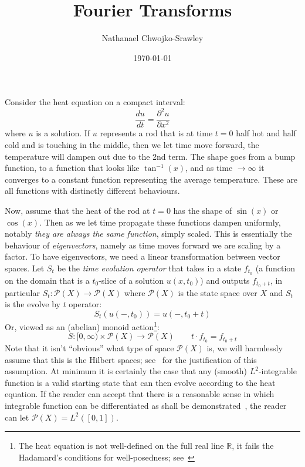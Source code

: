\documentclass{article}
\title{Fourier Transforms}
\author{Nathanael Chwojko-Srawley}
\date{\today}
\renewcommand{\maketitle}{
    \quad
    \vspace{1em}
  \begin{center}
      \LARGE\bfseries \thetitle \par
      \vspace{0.6em}
      \large
  \end{center}
    \vspace{1em}
}
\newcommand{\R}{{\mathbb{R}}}
\newcommand{\SP}{\mathscr{P}}
\begin{document}
\maketitle


Consider the heat equation on a compact interval:
\begin{equation}\label{eq:linHeatEq}
	\frac{du}{dt} = \frac{\partial^2 u}{\partial x^2}
\end{equation}
where $u$ is a solution. If $u$ represents a rod that is at time $t = 0$ half hot and half cold and is touching in the
middle, then we let time move forward, the temperature will dampen out due to the 2nd term. The shape goes from
a bump function, to a function that looks like $\tan^{-1}(x)$, and as time $\to \infty$ it converges to
a constant function representing the average temperature. These are all functions with distinctly different behaviours.

Now, assume that the heat of the rod at $t = 0$ has the shape of $\sin(x)$ or $\cos(x)$. Then as we let time
propagate these functions dampen uniformly, notably \emph{they are always
the same function}, simply scaled. This is essentially the behaviour of \emph{eigenvectors}, namely as time
moves forward we are scaling by a factor. To have eigenvectors, we need a linear transformation between vector
spaces. Let $S_t$ be the \emph{time evolution operator} that takes in a state $f_{t_0}$ (a function on the
domain that is a $t_0$-slice of a solution $u(x,t_0)$) and outputs $f_{t_0+t}$, in particular $S_t: \SP(X) \to
\SP(X)$ where $\SP(X)$ is the state space over $X$  and $S_t$ is the evolve by $t$ operator:
\[
	S_t(u(-, t_0)) = u(-, t_0+t)
\]
Or, viewed as an (abelian) monoid action\footnote{The heat equation is not well-defined on the full real line
$\R$, it fails the Hadamard’s conditions for well-posedness; see~\cite{NatePDE}}:
\[
	S: [0, \infty) \times \SP(X) \to \SP(X) \qquad t\cdot f_{t_0} = f_{t_0+t}
\]
Note that it isn't ``obvious'' what type of space $\SP(X)$ is, we will harmlessly assume that this is the
Hilbert spaces; see~\cite{NatePDE} for the justification of this assumption. At minimum it is certainly the
case that any (smooth) $L^2$-integrable function is a valid starting state that can then evolve according to
the heat equation. If the reader can accept that there is a reasonable sense in which integrable function can
be differentiated as shall be demonstrated~\cite{NateRealAnalysis}, the reader can let $\SP(X)
= L^2([0,1])$.
\end{document}
